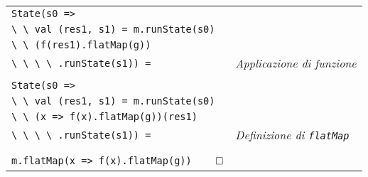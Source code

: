 \begin{tabularx}{\textwidth}{ll}
\\
\lstinline{State(s0 =>} \\
\lstinline{\ \ val (res1, s1) = m.runState(s0)} \\
\lstinline{\ \ (f(res1).flatMap(g))} \\
\lstinline{\ \ \ \ .runState(s1)) =} & \emph{Applicazione di funzione} \\
\\
\lstinline{State(s0 =>} \\
\lstinline{\ \ val (res1, s1) = m.runState(s0)} \\
\lstinline{\ \ (x => f(x).flatMap(g))(res1)} \\
\lstinline{\ \ \ \ .runState(s1)) =} & \emph{Definizione di \lstinline{flatMap}} \\
\\
\lstinline{m.flatMap(x => f(x).flatMap(g))} $\qed$\\
\end{tabularx}


